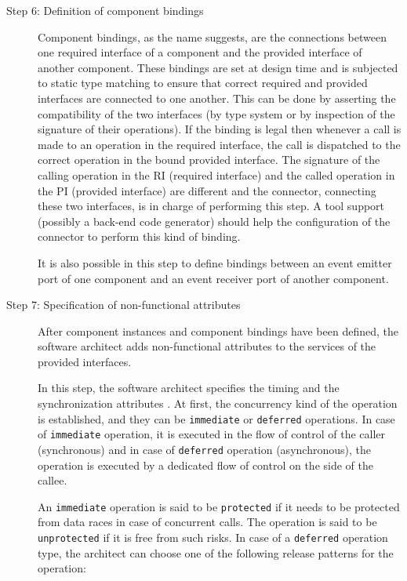 \begin{description}
\item [Step 6: Definition of component bindings] Component bindings, as the name suggests, are the connections between one required interface of a component and the provided interface of another component. These bindings are set at design time and is subjected to static type matching to ensure that correct required and provided interfaces are connected to one another. This can be done by asserting the compatibility of the two interfaces (by type system or by inspection of the signature of their operations). If the binding is legal then whenever a call is made to an operation in the required interface, the call is dispatched to the correct operation in the bound provided interface. The signature of the calling operation in the RI (required interface) and the called operation in the PI (provided interface) are different and the connector, connecting these two interfaces, is in charge of performing this step. A tool support (possibly a back-end code generator) should help the configuration of the connector to perform this kind of binding.

It is also possible in this step to define bindings between an event emitter port of one component and an event receiver port of another component.

\item [Step 7: Specification of non-functional attributes] After component instances and component bindings have been defined, the software architect adds non-functional attributes to the services of the provided interfaces. 

In this step, the software architect specifies the timing and the synchronization attributes \cite{CompBasedProcess}. At first, the concurrency kind of the operation is established, and they can be \texttt{immediate} or \texttt{deferred} operations. In case of \texttt{immediate} operation, it is executed in the flow of control of the caller (synchronous) and in case of \texttt{deferred} operation (asynchronous), the operation is executed by a dedicated flow of control on the side of the callee. 

An \texttt{immediate} operation is said to be \texttt{protected} if it needs to be protected from data races in case of concurrent calls. The operation is said to be \texttt{unprotected} if it is free from such risks. In case of a \texttt{deferred} operation type, the architect can choose one of the following release patterns for the operation:


\end{description}
